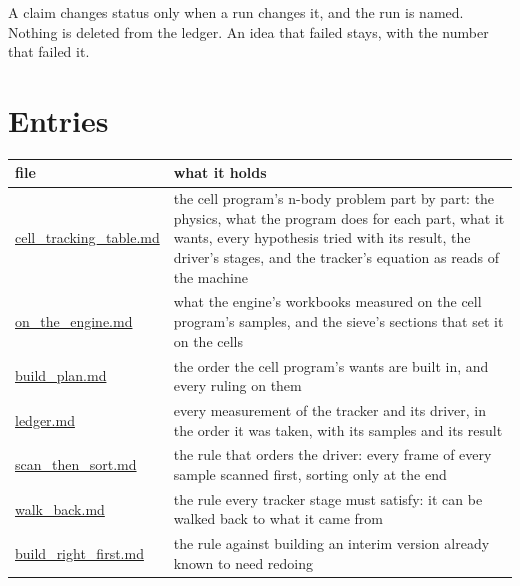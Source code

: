 A claim changes status only when a run changes it, and the run is named. Nothing is deleted from the ledger. An idea that failed stays, with the number that failed it.

\section{\texorpdfstring{Entries}{Entries}}

{\small
\setlength{\tabcolsep}{6pt}
\begin{longtable}{>{\RaggedRight\arraybackslash}p{}>{\RaggedRight\arraybackslash}p{}}
\toprule
file & what it holds \\
\midrule
\endhead
\hyperref[chap:cell-tracking-table]{cell\_\allowbreak{}tracking\_\allowbreak{}table.md} & the cell program's n-body problem part by part: the physics, what the program does for each part, what it wants, every hypothesis tried with its result, the driver's stages, and the tracker's equation as reads of the machine \\
\hyperref[chap:on-the-engine]{on\_\allowbreak{}the\_\allowbreak{}engine.md} & what the engine's workbooks measured on the cell program's samples, and the sieve's sections that set it on the cells \\
\hyperref[chap:build-plan]{build\_\allowbreak{}plan.md} & the order the cell program's wants are built in, and every ruling on them \\
\hyperref[chap:ledger]{ledger.md} & every measurement of the tracker and its driver, in the order it was taken, with its samples and its result \\
\hyperref[chap:scan-then-sort]{scan\_\allowbreak{}then\_\allowbreak{}sort.md} & the rule that orders the driver: every frame of every sample scanned first, sorting only at the end \\
\hyperref[chap:walk-back]{walk\_\allowbreak{}back.md} & the rule every tracker stage must satisfy: it can be walked back to what it came from \\
\hyperref[chap:build-right-first]{build\_\allowbreak{}right\_\allowbreak{}first.md} & the rule against building an interim version already known to need redoing \\
\bottomrule
\end{longtable}
}

